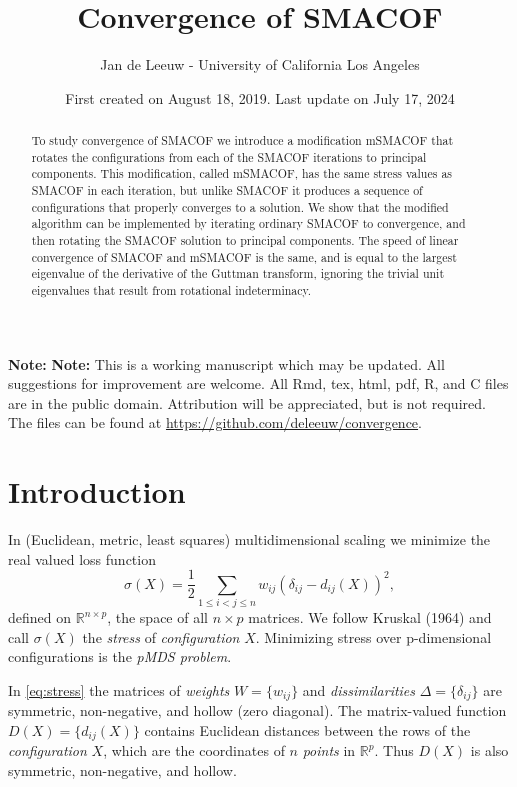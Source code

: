 \documentclass[
  12pt,
]{article}
\title{Convergence of SMACOF}
\author{Jan de Leeuw - University of California Los Angeles}
\date{First created on August 18, 2019. Last update on July 17, 2024}
\begin{document}
\maketitle
\begin{abstract}
To study convergence of SMACOF we introduce a modification mSMACOF that rotates the configurations from each of the SMACOF iterations to principal components. This modification, called mSMACOF, has the same stress values as SMACOF in each iteration, but unlike SMACOF it produces a sequence of configurations that properly converges to a solution. We show that the modified algorithm can be implemented by iterating ordinary SMACOF to convergence, and then rotating the SMACOF solution to principal components. The speed of linear convergence of SMACOF and mSMACOF is the same, and is equal to the largest eigenvalue of the derivative of the Guttman transform, ignoring the trivial unit eigenvalues that result from rotational indeterminacy.
\end{abstract}

{
\setcounter{tocdepth}{3}
\tableofcontents
}
\textbf{Note:} \textbf{Note:} This is a working manuscript which may be updated.
All suggestions for improvement are welcome. All Rmd, tex,
html, pdf, R, and C files are in the public domain. Attribution will be
appreciated, but is not required. The files can be found at
\url{https://github.com/deleeuw/convergence}.

\section{Introduction}\label{introduction}

In (Euclidean, metric, least squares) multidimensional scaling we minimize the real valued loss function
\begin{equation}
\sigma(X)=\frac12\mathop{\sum}_{1\leq i<j\leq n} w_{ij}(\delta_{ij}-d_{ij}(X))^2,
\label{eq:stress}
\end{equation}
defined on \(\mathbb{R}^{n\times p}\), the space of all \(n\times p\) matrices. We follow Kruskal (1964) and call \(\sigma(X)\) the \emph{stress} of \emph{configuration} \(X\). Minimizing stress over p-dimensional configurations is the \emph{pMDS problem}.

In \eqref{eq:stress} the matrices of \emph{weights} \(W=\{w_{ij}\}\) and \emph{dissimilarities} \(\Delta=\{\delta_{ij}\}\) are symmetric, non-negative, and hollow (zero diagonal). The matrix-valued function \(D(X)=\{d_{ij}(X)\}\) contains Euclidean distances between the rows of the \emph{configuration} \(X\), which are the coordinates of \(n\) \emph{points} in \(\mathbb{R}^p\). Thus \(D(X)\) is also symmetric, non-negative, and hollow.
\end{document}
